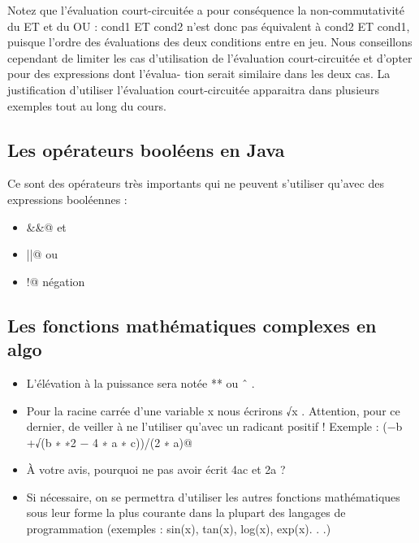 \documentclass[11pt,a4paper]{article}
\begin{document}
            \par
        
          Notez que l'\'evaluation court-circuit\'ee a pour cons\'equence la non-commutativit\'e du ET et
          du OU : cond1 ET cond2 n'est donc pas \'equivalent \`a cond2 ET cond1, puisque l'ordre des
          \'evaluations des deux conditions entre en jeu. Nous conseillons cependant de limiter les cas
          d'utilisation de l'\'evaluation court-circuit\'ee et d'opter pour des expressions dont l'\'evalua-
          tion serait similaire dans les deux cas. La justification d'utiliser l'\'evaluation court-circuit\'ee
          apparaitra dans plusieurs exemples tout au long du cours.
          
            \par
        \subsection{Les op\'erateurs bool\'eens en Java}
          Ce sont des op\'erateurs tr\`es importants qui ne peuvent s'utiliser qu'avec des expressions bool\'eennes :
          
					\begin{itemize}
				
			\item \verb@&&@ et 
			\item \verb@||@ ou 
			\item \verb@!@ n\'egation 
					\end{itemize}
				
            \par
        \subsection{Les fonctions math\'ematiques complexes en algo}
					\begin{itemize}
				
			\item L'\'el\'evation \`a la puissance sera not\'ee ** ou ˆ . 
			\item Pour la racine carr\'ee d'une variable x nous \'ecrirons √x . Attention, pour ce dernier, de veiller \`a ne l'utiliser qu'avec un radicant positif !
            Exemple : \verb@(−b +√(b ∗ ∗2 − 4 ∗ a ∗ c))/(2 ∗ a)@
			\item  \`A votre avis, pourquoi ne pas avoir \'ecrit \guillemotleft  4ac \guillemotright  et \guillemotleft  2a \guillemotright  ?
			\item Si n\'ecessaire, on se permettra d'utiliser les autres fonctions math\'ematiques sous leur forme
            la plus courante dans la plupart des langages de programmation (exemples : sin(x), tan(x), log(x), exp(x). . .)
					\end{itemize}
				
\end{document}
